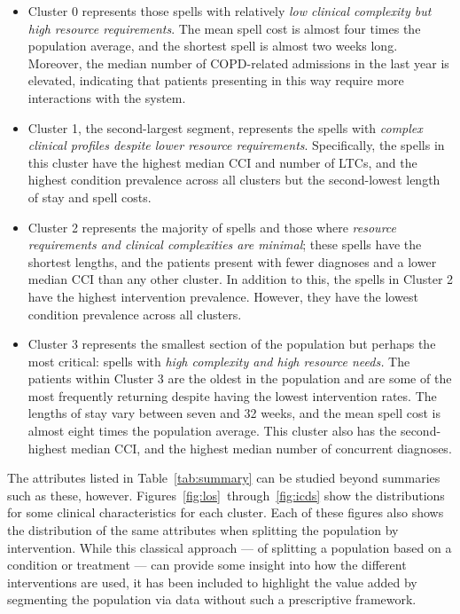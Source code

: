 \begin{itemize}
    \item Cluster 0 represents those spells with relatively {\slshape low
        clinical complexity but high resource requirements}. The mean spell cost
        is almost four times the population average, and the shortest spell is
        almost two weeks long. Moreover, the median number of COPD-related
        admissions in the last year is elevated, indicating that patients
        presenting in this way require more interactions with the system.
    \item Cluster 1, the second-largest segment, represents the spells with
        {\slshape complex clinical profiles despite lower resource
        requirements}. Specifically, the spells in this cluster have the highest
        median CCI and number of LTCs, and the highest condition prevalence
        across all clusters but the second-lowest length of stay and spell
        costs.
    \item Cluster 2 represents the majority of spells and those where {\slshape
        resource requirements and clinical complexities are minimal}; these
        spells have the shortest lengths, and the patients present with fewer
        diagnoses and a lower median CCI than any other cluster. In addition to
        this, the spells in Cluster 2 have the highest intervention prevalence.
        However, they have the lowest condition prevalence across all clusters.
    \item Cluster 3 represents the smallest section of the population but
        perhaps the most critical: spells with {\slshape high complexity and
        high resource needs.} The patients within Cluster 3 are the oldest in
        the population and are some of the most frequently returning despite
        having the lowest intervention rates. The lengths of stay vary between
        seven and 32 weeks, and the mean spell cost is almost eight times the
        population average. This cluster also has the second-highest median
        CCI, and the highest median number of concurrent diagnoses.
\end{itemize}

The attributes listed in Table~\ref{tab:summary} can be studied beyond summaries
such as these, however. Figures~\ref{fig:los}~through~\ref{fig:icds} show the
distributions for some clinical characteristics for each cluster. Each of these
figures also shows the distribution of the same attributes when splitting the
population by intervention. While this classical approach --- of splitting a
population based on a condition or treatment --- can provide some insight into
how the different interventions are used, it has been included to highlight the
value added by segmenting the population via data without such a prescriptive
framework.

